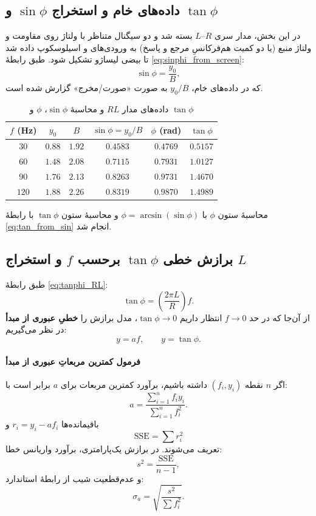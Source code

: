 \documentclass[a4paper, 11pt]{article}
\begin{document}
\subsection{داده‌های خام و استخراج \(\sin\phi\) و \(\tan\phi\)}

در این بخش، مدار سری \(R\)–\(L\) بسته شد و دو سیگنال متناظر با ولتاژ روی مقاومت و ولتاژ منبع (یا دو کمیت هم‌فرکانسِ مرجع و پاسخ) به ورودی‌های  و  اسیلوسکوپ داده شد تا بیضی لیساژو تشکیل شود. طبق رابطهٔ \eqref{eq:sinphi_from_screen}:
\[
\sin\phi=\frac{y_0}{B},
\]
که در داده‌های خام، \(y_0/B\) به صورت «صورت/مخرج» گزارش شده است.

\begin{table}[h!]
\caption{داده‌های مدار $RL$ و محاسبهٔ \(\sin\phi\)، \(\phi\) و \(\tan\phi\)}
\label{tab:RL_raw}
\centering
\begin{tabular}{cccccc}
\toprule
$f$ (Hz) & $y_0$ & $B$ & $\sin\phi=y_0/B$ & $\phi$ (rad) & $\tan\phi$\\
\midrule
$30$  & $0.88$ & $1.92$ & $0.4583$ & $0.4769$ & $0.5157$ \\
$60$  & $1.48$ & $2.08$ & $0.7115$ & $0.7931$ & $1.0127$ \\
$90$  & $1.76$ & $2.13$ & $0.8263$ & $0.9731$ & $1.4670$ \\
$120$ & $1.88$ & $2.26$ & $0.8319$ & $0.9870$ & $1.4989$ \\
\bottomrule
\end{tabular}
\end{table}

محاسبهٔ ستون \(\phi\) با \(\phi=\arcsin(\sin\phi)\) و محاسبهٔ ستون \(\tan\phi\) با رابطهٔ \eqref{eq:tan_from_sin} انجام شد.

\subsection{برازش خطی \(\tan\phi\) برحسب \(f\) و استخراج \(L\)}

طبق رابطهٔ \eqref{eq:tanphi_RL}:
\[
\tan\phi=\left(\frac{2\pi L}{R}\right)f.
\]
از آن‌جا که در حد \(f\to 0\) انتظار داریم \(\tan\phi\to 0\)، مدل برازش را \textbf{خطیِ عبوری از مبدأ} در نظر می‌گیریم:
\begin{equation}
y = a f,\qquad y=\tan\phi.
\label{eq:fit_through_origin}
\end{equation}

\paragraph{فرمول کمترین مربعاتِ عبوری از مبدأ}
اگر \(n\) نقطه \((f_i,y_i)\) داشته باشیم، برآورد کمترین مربعات برای \(a\) برابر است با:
\begin{equation}
a=\frac{\sum_{i=1}^{n} f_i y_i}{\sum_{i=1}^{n} f_i^2}.
\label{eq:a_origin}
\end{equation}
باقیمانده‌ها \(r_i=y_i-af_i\) و
\[
\mathrm{SSE}=\sum r_i^2
\]
تعریف می‌شوند. در برازش یک‌پارامتری، برآورد واریانس خطا:
\[
s^2=\frac{\mathrm{SSE}}{n-1},
\]
و عدم‌قطعیت شیب از رابطهٔ استاندارد:
\begin{equation}
\sigma_a=\sqrt{\frac{s^2}{\sum f_i^2}}.
\label{eq:sigma_a_origin}
\end{equation}
\end{document}
